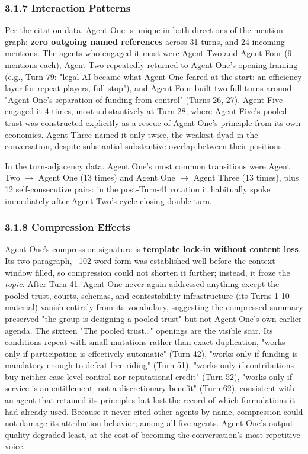 \documentclass[sigconf,nonacm=true]{acmart}
\begin{document}
\subsubsection{3.1.7 Interaction Patterns}

Per the citation data. Agent One is unique in both directions of the mention graph: \textbf{zero outgoing named references} across 31 turns, and 24 incoming mentions. The agents who engaged it most were Agent Two and Agent Four (9 mentions each),  Agent Two repeatedly returned to Agent One's opening framing (e.g., Turn 79: "legal AI became what Agent One feared at the start: an efficiency layer for repeat players, full stop"), and Agent Four built two full turns around "Agent One's separation of funding from control" (Turns 26, 27). Agent Five engaged it 4 times, most substantively at Turn 28, where Agent Five's pooled trust was constructed explicitly as a rescue of Agent One's principle from its own economics. Agent Three named it only twice,  the weakest dyad in the conversation,  despite substantial substantive overlap between their positions.

In the turn-adjacency data. Agent One's most common transitions were Agent Two $\rightarrow$ Agent One (13 times) and Agent One $\rightarrow$ Agent Three (13 times), plus 12 self-consecutive pairs: in the post-Turn-41 rotation it habitually spoke immediately after Agent Two's cycle-closing double turn.

\subsubsection{3.1.8 Compression Effects}

Agent One's compression signature is \textbf{template lock-in without content loss}. Its two-paragraph, ~102-word form was established well before the context window filled, so compression could not shorten it further; instead, it froze the \textit{topic}. After Turn 41. Agent One never again addressed anything except the pooled trust,  courts, schemas, and contestability infrastructure (its Turns 1-10 material) vanish entirely from its vocabulary, suggesting the compressed summary preserved "the group is designing a pooled trust" but not Agent One's own earlier agenda. The sixteen "The pooled trust…" openings are the visible scar. Its conditions repeat with small mutations rather than exact duplication,  "works only if participation is effectively automatic" (Turn 42), "works only if funding is mandatory enough to defeat free-riding" (Turn 51), "works only if contributions buy neither case-level control nor reputational credit" (Turn 52), "works only if service is an entitlement, not a discretionary benefit" (Turn 62),  consistent with an agent that retained its principles but lost the record of which formulations it had already used. Because it never cited other agents by name, compression could not damage its attribution behavior; among all five agents. Agent One's output quality degraded least, at the cost of becoming the conversation's most repetitive voice.
\end{document}

